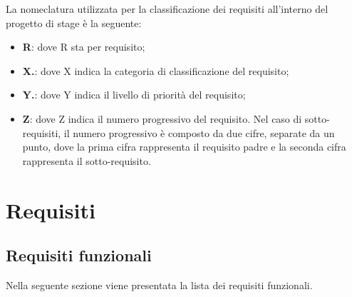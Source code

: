 \newline
La nomeclatura utilizzata per la classificazione dei requisiti all'interno del progetto di stage è la seguente:
\begin{itemize}
    \item \textbf{R}: dove R sta per requisito;
    \item \textbf{X.}: dove X indica la categoria di classificazione del requisito;
    \item \textbf{Y.}: dove Y indica il livello di priorità del requisito;
    \item \textbf{Z}: dove Z indica il numero progressivo del requisito. Nel caso di sotto-requisiti, il numero progressivo è composto da due cifre, separate da un punto,
          dove la prima cifra rappresenta il requisito padre e la seconda cifra rappresenta il sotto-requisito.
\end{itemize}

\newpage
\section{Requisiti}

\subsection{Requisiti funzionali}
Nella seguente sezione viene presentata la lista dei requisiti funzionali.

